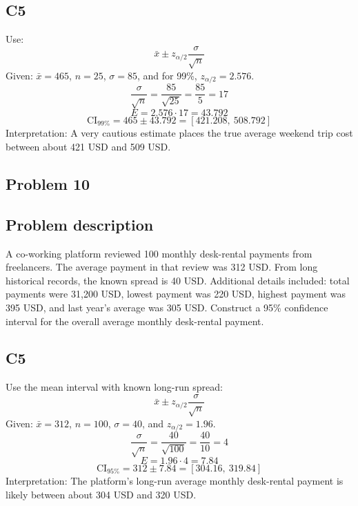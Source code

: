 \begin{ExamProblems}
		\subsection*{C5}
		Use:
		\[
		\bar{x} \pm z_{\alpha/2}\frac{\sigma}{\sqrt{n}}
		\]
		Given: $\bar{x}=465$, $n=25$, $\sigma=85$, and for 99\%, $z_{\alpha/2}=2.576$.
		\[
		\frac{\sigma}{\sqrt{n}}=\frac{85}{\sqrt{25}}=\frac{85}{5}=17
		\]
		\[
		E=2.576\cdot 17=43.792
		\]
		\[
		\text{CI}_{99\%}=465\pm 43.792=[421.208,\ 508.792]
		\]
		Interpretation: A very cautious estimate places the true average weekend trip cost between about 421 USD and 509 USD.

		\newpage
		\item
		\subsection*{Problem 10}
		\subsection*{Problem description}
		A co-working platform reviewed 100 monthly desk-rental payments from freelancers.
		The average payment in that review was 312 USD.
		From long historical records, the known spread is 40 USD.
		Additional details included: total payments were 31{,}200 USD, lowest payment was 220 USD, highest payment was 395 USD, and last year's average was 305 USD.
		Construct a 95\% confidence interval for the overall average monthly desk-rental payment.

		\subsection*{C5}
		Use the mean interval with known long-run spread:
		\[
		\bar{x} \pm z_{\alpha/2}\frac{\sigma}{\sqrt{n}}
		\]
		Given: $\bar{x}=312$, $n=100$, $\sigma=40$, and $z_{\alpha/2}=1.96$.
		\[
		\frac{\sigma}{\sqrt{n}}=\frac{40}{\sqrt{100}}=\frac{40}{10}=4
		\]
		\[
		E=1.96\cdot 4=7.84
		\]
		\[
		\text{CI}_{95\%}=312\pm 7.84=[304.16,\ 319.84]
		\]
		Interpretation: The platform's long-run average monthly desk-rental payment is likely between about 304 USD and 320 USD.

	\end{ExamProblems}

